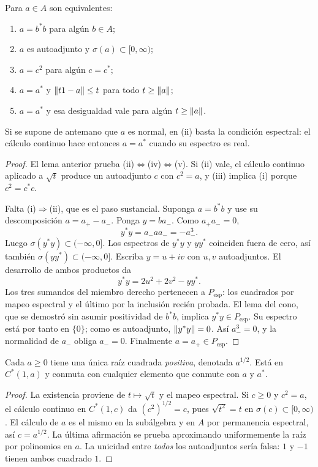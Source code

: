 \begin{teorema}\label{v3:positividad-equivalencias}
Para $a\in A$ son equivalentes:
\begin{enumerate}[label=(\roman*)]
\item $a=b^*b$ para algún $b\in A$;
\item $a$ es autoadjunto y $\sigma(a)\subset[0,\infty)$;
\item $a=c^2$ para algún $c=c^*$;
\item $a=a^*$ y $\left\lVert t1-a\right\rVert\le t$ para todo $t\ge\left\lVert a\right\rVert$;
\item $a=a^*$ y esa desigualdad vale para algún $t\ge\left\lVert a\right\rVert$.
\end{enumerate}
Si se supone de antemano que $a$ es normal, en (ii) basta la condición espectral: el cálculo continuo hace entonces $a=a^*$ cuando su espectro es real.
\end{teorema}
\begin{proof}
El lema anterior prueba (ii)$\Leftrightarrow$(iv)$\Leftrightarrow$(v). Si (ii) vale, el cálculo continuo aplicado a $\sqrt t$ produce un autoadjunto $c$ con $c^2=a$, y (iii) implica (i) porque $c^2=c^*c$.

Falta (i)$\Rightarrow$(ii), que es el paso sustancial. Suponga $a=b^*b$ y use su descomposición $a=a_+-a_-$. Ponga $y=ba_-$. Como $a_+a_-=0$,
\[
 y^*y=a_-aa_-=-a_-^3.
\]
Luego $\sigma(y^*y)\subset(-\infty,0]$. Los espectros de $y^*y$ y $yy^*$ coinciden fuera de cero, así también $\sigma(yy^*)\subset(-\infty,0]$. Escriba $y=u+iv$ con $u,v$ autoadjuntos. El desarrollo de ambos productos da
\[
 y^*y=2u^2+2v^2-yy^*.
\]
Los tres sumandos del miembro derecho pertenecen a $P_{\mathrm{esp}}$: los cuadrados por mapeo espectral y el último por la inclusión recién probada. El lema del cono, que se demostró sin asumir positividad de $b^*b$, implica $y^*y\in P_{\mathrm{esp}}$. Su espectro está por tanto en $\{0\}$; como es autoadjunto, $\left\lVert y^*y\right\rVert=0$. Así $a_-^3=0$, y la normalidad de $a_-$ obliga $a_-=0$. Finalmente $a=a_+\in P_{\mathrm{esp}}$.
\end{proof}

\begin{corolario}\label{v3:raiz-positiva}
Cada $a\ge0$ tiene una única raíz cuadrada \emph{positiva}, denotada $a^{1/2}$. Está en $C^*(1,a)$ y conmuta con cualquier elemento que conmute con $a$ y $a^*$.
\end{corolario}
\begin{proof}
La existencia proviene de $t\mapsto\sqrt t$ y el mapeo espectral. Si $c\ge0$ y $c^2=a$, el cálculo continuo en $C^*(1,c)$ da $(c^2)^{1/2}=c$, pues $\sqrt{t^2}=t$ en $\sigma(c)\subset[0,\infty)$. El cálculo de $a$ es el mismo en la subálgebra y en $A$ por permanencia espectral, así $c=a^{1/2}$. La última afirmación se prueba aproximando uniformemente la raíz por polinomios en $a$. La unicidad entre \emph{todos} los autoadjuntos sería falsa: $1$ y $-1$ tienen ambos cuadrado $1$.
\end{proof}

